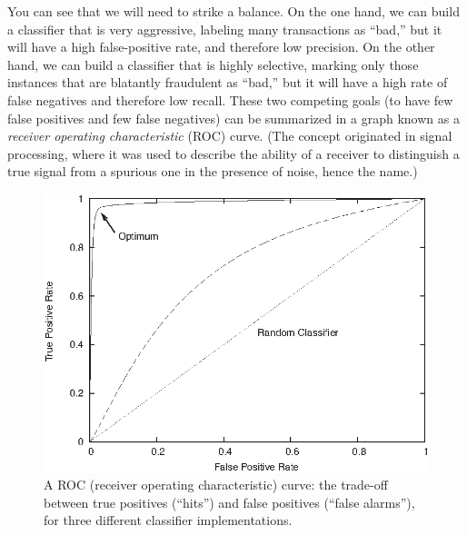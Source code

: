 You can see that we will need to strike a balance. On the one hand, we
can build a classifier that is very aggressive, labeling many
transactions as ``bad,'' but it will have a high false-positive rate,
and therefore low precision. On the other hand, we can build a
classifier that is highly selective, marking only those instances that
are blatantly fraudulent as ``bad,'' but it will have a high rate of
false negatives and therefore low recall. These two competing goals
(to have few false positives and few false negatives) can be
summarized in a graph known as a \emph{receiver operating
  characteristic} (ROC) curve.  (The concept originated in signal
processing, where it was used to describe the ability of a receiver to
distinguish a true signal from a spurious one in the presence of
noise, hence the name.)

\begin{figure}
\centerline{\includegraphics{img/roc}}
  \caption{A ROC (receiver operating characteristic) curve: the
    trade-off between true positives (``hits'') and false positives
    (``false alarms''), for three different classifier
    implementations.}
  \label{fig:roc}\vspace*{-6pt}
\end{figure}

